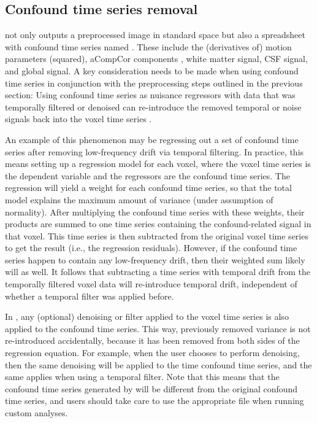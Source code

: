 \subsection{Confound time series removal}

 not only outputs a preprocessed image in standard space but also a spreadsheet with confound time series named . These include the (derivatives of) motion parameters (squared), aCompCor components \parencite{behzadi2007}, white matter signal, CSF signal, and global signal. A key consideration needs to be made when using  confound time series in conjunction with the preprocessing steps outlined in the previous section: Using confound time series as nuisance regressors with data that was temporally filtered or denoised can re-introduce the removed temporal or noise signals back into the voxel time series \parencite{hallquist2013}.

An example of this phenomenon may be regressing out a set of  confound time series after removing low-frequency drift via temporal filtering. In practice, this means setting up a regression model for each voxel, where the voxel time series is the dependent variable and the regressors are the confound time series. The regression will yield a weight for each confound time series, so that the total model explains the maximum amount of variance (under assumption of normality). After multiplying the confound time series with these weights, their products are summed to one time series containing the confound-related signal in that voxel. This time series is then subtracted from the original voxel time series to get the result (i.e., the regression residuals). However, if the confound time series happen to contain any low-frequency drift, then their weighted sum likely will as well. It follows that subtracting a time series with temporal drift from the temporally filtered voxel data will re-introduce temporal drift, independent of whether a temporal filter was applied before.

In , any (optional) denoising or filter applied to the voxel time series is also applied to the  confound time series. This way, previously removed variance is not re-introduced accidentally, because it has been removed from both sides of the regression equation. For example, when the user chooses to perform  denoising, then the same denoising will be applied to the time  confound time series, and the same applies when using a temporal filter. Note that this means that the confound time series generated by  will be different from the original  confound time series, and users should take care to use the appropriate file when running custom analyses.
